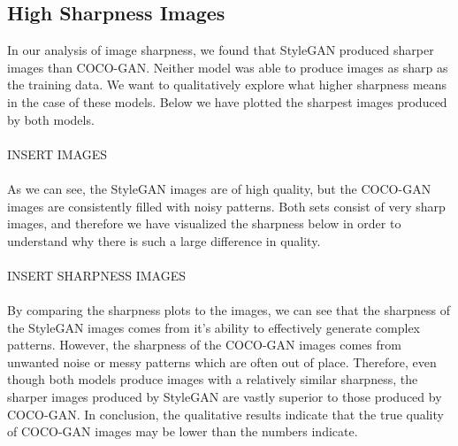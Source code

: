 \documentclass[12pt]{article}
\begin{document}
\begin{multicols*}{2}
        \subsection{High Sharpness Images}
        In our analysis of image sharpness, we found that StyleGAN produced sharper images than COCO-GAN.
        Neither model was able to produce images as sharp as the training data.
        We want to qualitatively explore what higher sharpness means in the case of these models.
        Below we have plotted the sharpest images produced by both models.
        \\\\
        INSERT IMAGES
        \\\\
        As we can see, the StyleGAN images are of high quality, but the COCO-GAN images are consistently filled with noisy patterns.
        Both sets consist of very sharp images, and therefore we have visualized the sharpness below in order to understand why there is such a large difference in quality.
        \\\\
        INSERT SHARPNESS IMAGES
        \\\\
        By comparing the sharpness plots to the images, we can see that the sharpness of the StyleGAN images comes from it's ability to effectively generate complex patterns.
        However, the sharpness of the COCO-GAN images comes from unwanted noise or messy patterns which are often out of place.
        Therefore, even though both models produce images with a relatively similar sharpness, the sharper images produced by StyleGAN are vastly superior to those produced by COCO-GAN.
        In conclusion, the qualitative results indicate that the true quality of COCO-GAN images may be lower than the numbers indicate.
    \end{multicols*}
\end{document}
